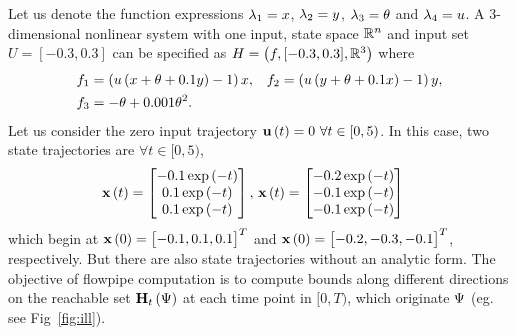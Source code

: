 \begin{example}\label{eg:ill}
Let us denote the function expressions $\lambda_{1} = x$, $\lambda_{2} = y$,
$\lambda_{3} = \theta$ and $\lambda_{4} = u$.  A $3$-dimensional nonlinear
system with one input, state space $\mathbb{R}^n$ and input set $U =
[-0.3,0.3]$ can be specified as $H = \left(f,[-0.3,0.3],\mathbb{R}^3\right)$ where
%
\begin{align*}
& f_1 = \left( u\left( x + \theta + 0.1y \right) - 1\right)x,
& f_2 = \left( u\left( y + \theta + 0.1x \right) - 1\right)y,\\
& f_3 = -\theta + 0.001\theta^2.
\end{align*}
%
Let us consider the zero input trajectory $\mathbf{u}\left(t\right) = 0~\forall
t\in[0,5)$.  In this case, two state trajectories are $\forall
t\in[0,5)$,
%
\begin{align*}
\mathbf{x}\left(t\right) = \begin{bmatrix} -0.1\exp\left(-t\right)\\ 0.1\exp\left(-t\right)\\ 0.1\exp\left(-t\right) \end{bmatrix},~
& \mathbf{x}\left(t\right) = \begin{bmatrix} -0.2\exp\left(-t\right)\\ -0.1\exp\left(-t\right)\\ -0.1\exp\left(-t\right) \end{bmatrix}
\end{align*}
%
which begin at $\mathbf{x}\left(0\right) = \begin{bmatrix}-0.1,0.1,0.1\end{bmatrix}^T$ and $\mathbf{x}\left(0\right)
= \begin{bmatrix}-0.2,-0.3,-0.1\end{bmatrix}^T$, respectively.
%
But there are also state trajectories without an analytic form.  The
objective of flowpipe computation is to compute bounds along different
directions on the reachable set $\mathbf{H}_{t}\left(\Psi\right)$ at each time
point in $[0,T)$, which originate $\Psi$ (eg. see Fig~\ref{fig:ill}).
\end{example}
%
%
